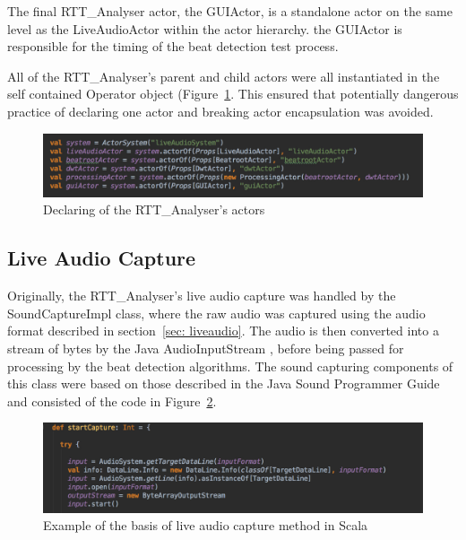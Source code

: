 \documentclass[a4paper, 11pt]{article}
\begin{document}
The final RTT\_Analyser actor, the GUIActor, is a standalone actor on the same level as the LiveAudioActor within the actor hierarchy. the GUIActor is responsible for the timing of the beat detection test process.\par

All of the RTT\_Analyser's parent and child actors were all instantiated in the self contained Operator object (Figure~\ref{fig: props}. This ensured that potentially dangerous practice of declaring one actor and breaking actor encapsulation \cite{akkaActors} was avoided.  

\begin{figure}[htbp]
\centering
\includegraphics[scale=0.35]{images/actorprops.jpg}
\caption{Declaring of the RTT\_Analyser's actors}
\label{fig: props}
\end{figure}

\subsection{Live Audio Capture}
Originally, the RTT\_Analyser's live audio capture was handled by the SoundCaptureImpl class, where the raw audio was captured using the audio format described in section~\ref{sec: liveaudio}. The audio is then converted into a stream of bytes by the Java AudioInputStream \cite{soundTrail}, before being passed for processing by the beat detection algorithms. The sound capturing components of this class were based on those described in the Java Sound Programmer Guide \cite{javasound} and consisted of the code in Figure~\ref{fig: startcap}.

\begin{figure}[htbp]
\centering
\includegraphics[scale=0.3]{images/startCap.jpg}
\caption{Example of the basis of live audio capture method in Scala}
\label{fig: startcap}
\end{figure}
\end{document}
